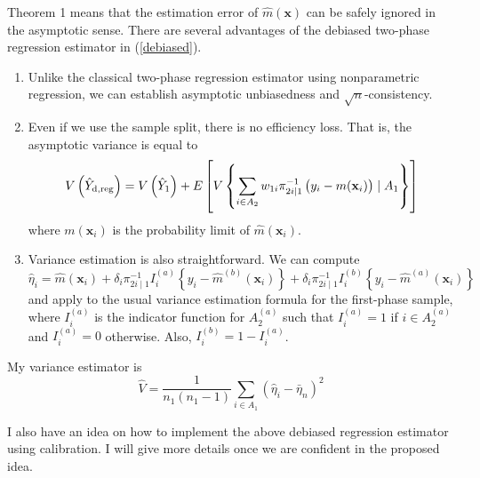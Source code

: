 \documentclass[12pt]{article}
\newcommand{\bx}{\mathbf{x}}
\begin{document}
Theorem 1 means that the estimation error of $\hat{m}(\bx)$ can be safely ignored in the asymptotic sense. There are several advantages of the debiased two-phase regression estimator in (\ref{debiased}). 
\begin{enumerate}
\item Unlike the classical two-phase regression estimator using nonparametric regression, we can establish asymptotic unbiasedness and  $\sqrt{n}$-consistency. 
\item Even if we use the sample split, there is no efficiency loss. That is, the asymptotic variance is equal to 
$$ V \left( \hat{Y}_{\rm d, reg} \right) = V \left( \hat{Y}_1 \right) + E\left[ V \left\{ \sum_{i \in A_2} w_{1i} \pi_{2i \mid 1}^{-1} \left( y_i - m(\bx_i) \right) \mid A_1 \right\} \right] 
$$
where $m(\bx_i)$ is the probability limit of $\hat{m}(\bx_i)$. 
\item Variance estimation is also straightforward. We can compute 
$$ \hat{\eta}_i = \hat{m}(\bx_i) +\delta_i  \pi_{2i \mid 1}^{-1} I_i^{(a)} \left\{ y_i - \hat{m}^{(b)}(\bx_i) \right\} +\delta_i \pi_{2i \mid 1}^{-1} I_i^{(b)} \left\{ y_i - \hat{m}^{(a)} (\bx_i) \right\}$$
and apply to the usual variance estimation formula for the first-phase sample, 
where $I_i^{(a)}$ is the indicator function for $A_2^{(a)}$ such that $I_i^{(a)} = 1$ if $i \in A_2^{(a)}$ and $I_i^{(a)}=0$ otherwise. Also, $I_i^{(b)}= 1- I_i^{(a)}$. 
\end{enumerate}


My variance estimator is 
$$ \hat{V} = \frac{1}{n_1 (n_1-1) } \sum_{i \in A_1} \left( \hat{\eta}_i - \bar{\eta}_n \right)^2 $$

I also have an idea on how to implement the above debiased regression estimator using calibration. I will give more details once we are confident in the proposed idea. 
\end{document}
